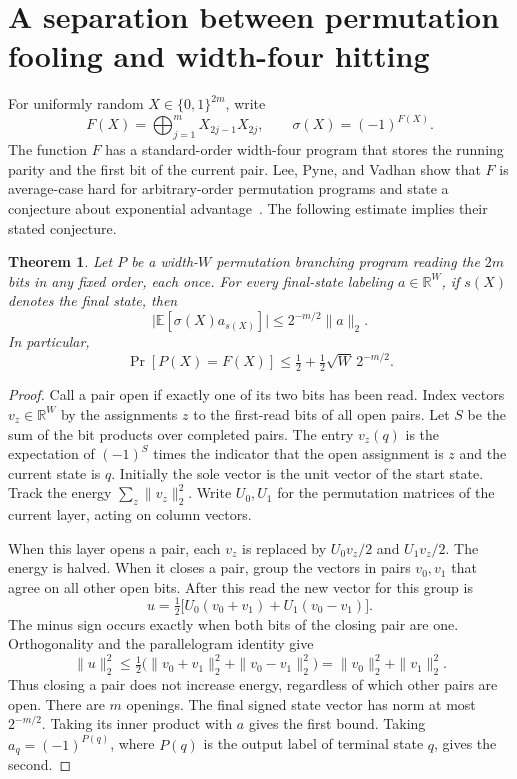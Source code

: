 \documentclass[11pt]{article}
\newtheorem{theorem}{Theorem}
\begin{document}
\section{A separation between permutation fooling and width-four hitting}
\label{sec:ip}

For uniformly random $X\in\{0,1\}^{2m}$, write
\[
 F(X)=\bigoplus_{j=1}^m X_{2j-1}X_{2j},
 \qquad \sigma(X)=(-1)^{F(X)}.
\]
The function $F$ has a standard-order width-four program that stores
the running parity and the first bit of the current pair. Lee, Pyne, and
Vadhan show that $F$ is average-case hard for arbitrary-order
permutation programs and state a conjecture about exponential
advantage~\cite[Theorem~12 and Conjecture~13]{LPV}. The following
estimate implies their stated conjecture.

\begin{theorem}\label{thm:ip-correlation}
Let $P$ be a width-$W$ permutation branching program reading the $2m$
bits in any fixed order, each once. For every final-state labeling
$a\in\mathbb R^W$, if $s(X)$ denotes the final state, then
\[
 \big|\mathbb E[\sigma(X)a_{s(X)}]\big|
 \le 2^{-m/2}\|a\|_2.
\]
In particular,
\[
 \Pr[P(X)=F(X)]\le \tfrac12+\tfrac12\sqrt W\,2^{-m/2}.
\]
\end{theorem}

\begin{proof}
Call a pair open if exactly one of its two bits has been read. Index
vectors $v_z\in\mathbb R^W$ by the assignments $z$ to the first-read
bits of all open pairs. Let $S$ be the sum of the bit products over
completed pairs. The entry $v_z(q)$ is the expectation of $(-1)^S$
times the indicator that the open assignment is $z$ and the current
state is $q$. Initially the sole vector is
the unit vector of the start state. Track the energy
$\sum_z\|v_z\|_2^2$. Write $U_0,U_1$ for the permutation matrices
of the current layer, acting on column vectors.

When this layer opens a pair, each $v_z$ is replaced by
$U_0v_z/2$ and $U_1v_z/2$. The energy is halved. When it closes a pair,
group the vectors in pairs $v_0,v_1$ that agree on all other open bits.
After this read the new vector for this group is
\[
 u=\tfrac12\bigl[U_0(v_0+v_1)+U_1(v_0-v_1)\bigr].
\]
The minus sign occurs exactly when both bits of the closing pair are
one. Orthogonality and the parallelogram identity give
\[
 \|u\|_2^2\le
 \tfrac12\bigl(\|v_0+v_1\|_2^2+\|v_0-v_1\|_2^2\bigr)
 =\|v_0\|_2^2+\|v_1\|_2^2.
\]
Thus closing a pair does not increase energy, regardless of which
other pairs are open. There are $m$ openings. The final signed
state vector has norm at most $2^{-m/2}$. Taking its inner product
with $a$ gives the first bound. Taking $a_q=(-1)^{P(q)}$, where
$P(q)$ is the output label of terminal state $q$, gives the second.
\end{proof}
\end{document}
